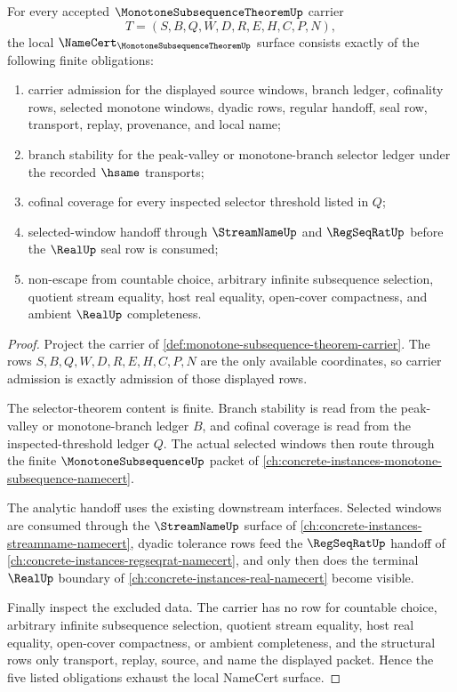 \begin{theorem}
\label{thm:monotone-subsequence-theorem-namecert-obligations}
For every accepted $\MonotoneSubsequenceTheoremUp$ carrier
$$
T=(S,B,Q,W,D,R,E,H,C,P,N),
$$
the local $\NameCert_{\MonotoneSubsequenceTheoremUp}$ surface consists exactly of the following finite obligations:
\begin{enumerate}
\item carrier admission for the displayed source windows, branch ledger, cofinality rows, selected monotone windows, dyadic rows, regular handoff, seal row, transport, replay, provenance, and local name;
\item branch stability for the peak-valley or monotone-branch selector ledger under the recorded $\hsame$ transports;
\item cofinal coverage for every inspected selector threshold listed in $Q$;
\item selected-window handoff through $\StreamNameUp$ and $\RegSeqRatUp$ before the $\RealUp$ seal row is consumed;
\item non-escape from countable choice, arbitrary infinite subsequence selection, quotient stream equality, host real equality, open-cover compactness, and ambient $\RealUp$ completeness.
\end{enumerate}
\end{theorem}
\begin{proof}
Project the carrier of \autoref{def:monotone-subsequence-theorem-carrier}. The rows $S,B,Q,W,D,R,E,H,C,P,N$ are the only available coordinates, so carrier admission is exactly admission of those displayed rows.

The selector-theorem content is finite. Branch stability is read from the peak-valley or monotone-branch ledger $B$, and cofinal coverage is read from the inspected-threshold ledger $Q$. The actual selected windows then route through the finite $\MonotoneSubsequenceUp$ packet of \autoref{ch:concrete-instances-monotone-subsequence-namecert}.

The analytic handoff uses the existing downstream interfaces. Selected windows are consumed through the $\StreamNameUp$ surface of \autoref{ch:concrete-instances-streamname-namecert}, dyadic tolerance rows feed the $\RegSeqRatUp$ handoff of \autoref{ch:concrete-instances-regseqrat-namecert}, and only then does the terminal $\RealUp$ boundary of \autoref{ch:concrete-instances-real-namecert} become visible.

Finally inspect the excluded data. The carrier has no row for countable choice, arbitrary infinite subsequence selection, quotient stream equality, host real equality, open-cover compactness, or ambient completeness, and the structural rows only transport, replay, source, and name the displayed packet. Hence the five listed obligations exhaust the local NameCert surface.
\end{proof}

